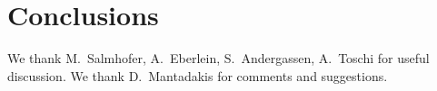 \documentclass[aps,prb,twocolumn,showpacs,groupedaddress]{revtex4-1}
\begin{document}
\section{Conclusions}
\label{sec:conclusions}


\begin{acknowledgments} 
We thank M.~Salmhofer, A.~Eberlein, S.~Andergassen, A.~Toschi for useful discussion. 
We thank D.~Mantadakis for comments and suggestions. 
\end{acknowledgments}
\begin{widetext}
\appendix
\label{sec:appendices}

\end{widetext}


%

\end{document}
